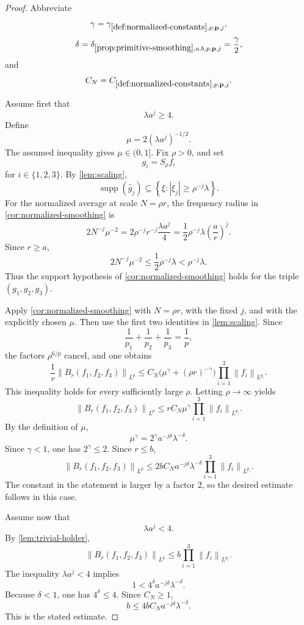 \documentclass[11pt]{article}
\newcommand{\supp}{\operatorname{supp}}
\newcommand{\norm}[2]{\left\lVert #1\right\rVert_{#2}}
\newcommand{\Cst}[2]{C_{\ref{#1},#2}}
\newcommand{\Exp}[2]{\delta_{\ref{#1},#2}}
\newcommand{\Gam}[2]{\gamma_{\ref{#1},#2}}
\newcommand{\abs}[1]{\left|#1\right|}
\newcommand{\set}[1]{\left\{#1\right\}}
\newcommand{\indices}{\{1,2,3\}}
\begin{document}
	\begin{proof}
		Abbreviate
		\[
		\gamma=\Gam{def:normalized-constants}{p,\mathbf p,j},
		\]
		\[
		\delta=\Exp{prop:primitive-smoothing}{a,b,p,\mathbf p,j}=\frac\gamma2,
		\]
		and
		\[
		C_N=\Cst{def:normalized-constants}{p,\mathbf p,j}.
		\]
		
		Assume first that
		\[
		\lambda a^j\geq4.
		\]
		Define
		\[
		\mu=2(\lambda a^j)^{-1/2}.
		\]
		The assumed inequality gives \(\mu\in(0,1]\).  Fix \(\rho>0\), and set
		\[
		g_i=S_\rho f_i
		\]
		for \(i\in\indices\).  By \cref{lem:scaling},
		\[
		\supp(\widehat g_j)
		\subseteq
		\set{\xi:\abs{\xi_j}\geq\rho^{-j}\lambda}.
		\]
		For the normalized average at scale \(N=\rho r\), the frequency radius in \cref{cor:normalized-smoothing} is
		\[
		2N^{-j}\mu^{-2}
		=
		2\rho^{-j}r^{-j}\frac{\lambda a^j}{4}
		=
		\frac12\rho^{-j}\lambda\left(\frac ar\right)^j.
		\]
		Since \(r\geq a\),
		\[
		2N^{-j}\mu^{-2}\leq\frac12\rho^{-j}\lambda<\rho^{-j}\lambda.
		\]
		Thus the support hypothesis of \cref{cor:normalized-smoothing} holds for the triple \((g_1,g_2,g_3)\).
		
		Apply \cref{cor:normalized-smoothing} with \(N=\rho r\), with the fixed \(j\), and with the explicitly chosen \(\mu\).  Then use the first two identities in \cref{lem:scaling}.  Since
		\[
		\frac1{p_1}+\frac1{p_2}+\frac1{p_3}=\frac1p,
		\]
		the factors \(\rho^{6/p}\) cancel, and one obtains
		\[
		\frac1r\norm{B_r(f_1,f_2,f_3)}{L^p}
		\leq
		C_N\bigl(\mu^\gamma+(\rho r)^{-\gamma}\bigr)
		\prod_{i=1}^{3}\norm{f_i}{L^{p_i}}.
		\]
		This inequality holds for every sufficiently large \(\rho\).  Letting \(\rho\to\infty\) yields
		\[
		\norm{B_r(f_1,f_2,f_3)}{L^p}
		\leq
		rC_N\mu^\gamma
		\prod_{i=1}^{3}\norm{f_i}{L^{p_i}}.
		\]
		By the definition of \(\mu\),
		\[
		\mu^\gamma=2^\gamma a^{-j\delta}\lambda^{-\delta}.
		\]
		Since \(\gamma<1\), one has \(2^\gamma\leq2\).  Since \(r\leq b\),
		\[
		\norm{B_r(f_1,f_2,f_3)}{L^p}
		\leq
		2bC_Na^{-j\delta}\lambda^{-\delta}
		\prod_{i=1}^{3}\norm{f_i}{L^{p_i}}.
		\]
		The constant in the statement is larger by a factor \(2\), so the desired estimate follows in this case.
		
		Assume now that
		\[
		\lambda a^j<4.
		\]
		By \cref{lem:trivial-holder},
		\[
		\norm{B_r(f_1,f_2,f_3)}{L^p}
		\leq
		b\prod_{i=1}^{3}\norm{f_i}{L^{p_i}}.
		\]
		The inequality \(\lambda a^j<4\) implies
		\[
		1<4^\delta a^{-j\delta}\lambda^{-\delta}.
		\]
		Because \(\delta<1\), one has \(4^\delta\leq4\).  Since \(C_N\geq1\),
		\[
		b
		\leq
		4bC_Na^{-j\delta}\lambda^{-\delta}.
		\]
		This is the stated estimate.
	\end{proof}
	
\end{document}
